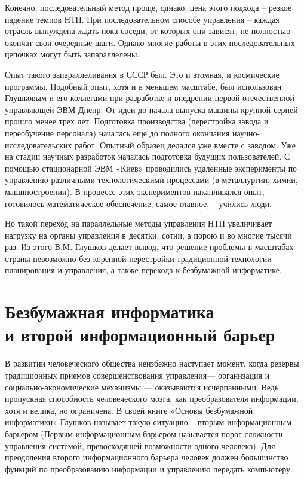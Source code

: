 Конечно, последовательный метод проще, однако, цена этого подхода – резкое
падение темпов НТП. При последовательном способе управления – каждая отрасль
вынуждена ждать пока соседи, от которых они зависят, не полностью окончат свои
очередные шаги. Однако многие работы в этих последовательных цепочках могут быть
запараллелены.
 
Опыт такого запараллеливания в СССР был. Это и атомная, и космические программы.
Подобный опыт, хотя и в меньшем масштабе, был использован Глушковым и его
коллегами при разработке и внедрении первой отечественной управляющей ЭВМ Днепр.
От идеи до начала выпуска машины крупной серией прошло менее трех лет.
Подготовка производства (перестройка завода и переобучение персонала) началась
еще до полного окончания научно-исследовательских работ. Опытный образец делался
уже вместе с заводом. Уже на стадии научных разработок началась подготовка
будущих пользователей. С помощью стационарной ЭВМ «Киев» проводились удаленные
эксперименты по управлению различными технологическими процессами (в
металлургии, химии, машиностроении). В процессе этих экспериментов накапливался
опыт, готовилось математическое обеспечение, самое главное, – учились люди.
 
Но такой переход на параллельные методы управления НТП увеличивает нагрузку на
органы управления в десятки, сотни, а порою и во многие тысячи раз. Из этого
В.М. Глушков делает вывод, что решение проблемы в масштабах страны невозможно
без коренной перестройки традиционной технологии планирования и управления, а
также перехода к безбумажной информатике.
 
\section{Безбумажная информатика\\и второй информационный барьер}
 
В развитии человеческого общества неизбежно наступает момент, когда резервы
традиционных приемов совершенствования управления— организация и
социально-экономические механизмы — оказываются исчерпанными. Ведь пропускная
способность человеческого мозга, как преобразователя информации, хотя и велика,
но ограничена. В своей книге «Основы безбумажной информатики» \cite{b4} Глушков
называет такую ситуацию – вторым информационным барьером (Первым информационным
барьером называется порог сложности управления системой, превосходящей
возможности одного человека). Для преодоления второго информационного барьера
человек должен большинство функций по преобразованию информации и управлению
передать компьютеру.
 
